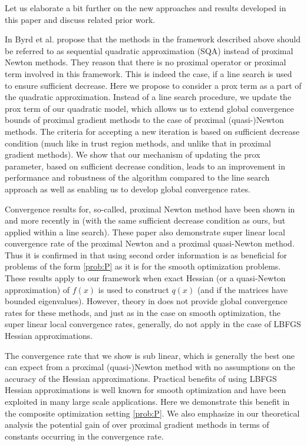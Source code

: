 \documentclass[11pt]{article}
\numberwithin{equation}{section}
\begin{document}
Let us elaborate a bit further on the new approaches and results developed in this paper and discuss related prior work. 

In \cite{Byrdetal2013} Byrd et al. propose that the methods in the framework  described above should be referred to as sequential quadratic approximation (SQA) instead of proximal Newton methods.  They reason that there is no proximal operator or proximal term involved in this framework. This is indeed the case, if a line search is used to ensure sufficient decrease. Here we propose to consider a prox term as a part of the quadratic approximation. 
Instead of a line search procedure, we update the prox term of our quadratic model, which allows us to extend global convergence bounds of proximal gradient methods to the case of proximal (quasi-)Newton methods. The criteria for accepting a new iteration is based on sufficient decrease condition (much like in trust region methods, and unlike that in proximal gradient methods).
We show that our mechanism of updating the prox parameter, based on sufficient decrease condition, leads to an improvement in performance and robustness of the algorithm compared to the line search approach as well as enabling us to develop global convergence rates. 

Convergence results for, so-called, proximal Newton method have been shown 
in \cite{Saundersetal} and more recently in \cite{Byrdetal2013} (with the same sufficient decrease condition as ours, but applied within a line search). These paper also demonstrate super linear local convergence rate of the proximal Newton and a proximal quasi-Newton method.
Thus it is confirmed in \cite{Byrdetal2013, Saundersetal} that using second order information is as beneficial for problems of the form  \eqref{prob:P}
as it is for the smooth optimization problems.  These results apply to our framework when exact Hessian (or a quasi-Newton approximation) of $f(x)$ is used to construct $q(x)$ (and if the matrices have bounded eigenvalues).  However, theory in \cite{Byrdetal2013, Saundersetal}
does not provide global convergence rates for these methods, and  just as in the case on smooth optimization,
the super linear local convergence rates, generally,  do not apply in the case of LBFGS Hessian approximations. 

The convergence rate that we show is sub linear, which is generally the best one can expect from a proximal (quasi-)Newton method
 with no assumptions on the accuracy of the Hessian approximations.  Practical benefits of using 
LBFGS Hessian approximations is well known for smooth optimization \cite{} and have been exploited in many large scale applications. 
Here we demonstrate this benefit in the composite optimization setting \eqref{prob:P}. We also emphasize  in our theoretical analysis the potential gain of over proximal gradient methods in terms of constants occurring in the convergence rate. 
\end{document}
